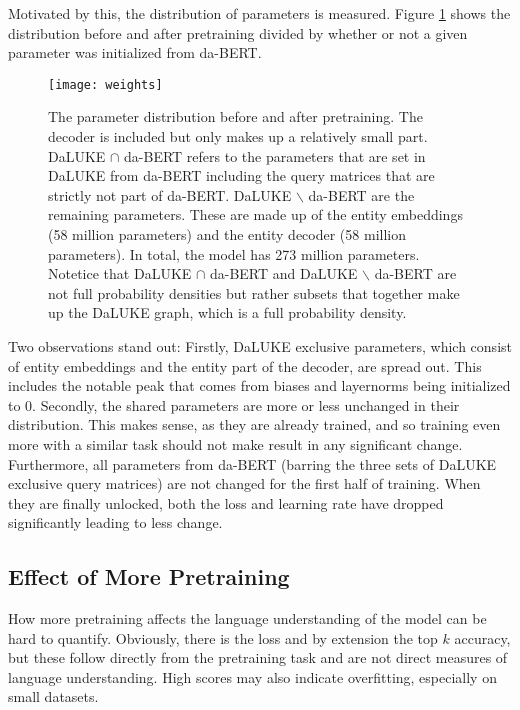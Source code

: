 \documentclass[main.tex]{subfiles}
\begin{document}
Motivated by this, the distribution of parameters is measured.
Figure \ref{fig:weight-dist} shows the distribution before and after pretraining divided by whether or not a given parameter was initialized from da-BERT.
\begin{figure}[H]
    \centering
    \texttt{[image: weights]}
    \caption{
        The parameter distribution before and after pretraining.
        The decoder is included but only makes up a relatively small part.
        DaLUKE $ \cap $ da-BERT refers to the parameters that are set in DaLUKE from da-BERT including the query matrices that are strictly not part of da-BERT.
        DaLUKE $ \backslash $ da-BERT are the remaining parameters.
        These are made up of the entity embeddings (58 million parameters) and the entity decoder (58 million parameters).
        In total, the model has 273 million parameters.
        Notetice that DaLUKE $ \cap $ da-BERT and DaLUKE $ \backslash $ da-BERT are not full probability densities but rather subsets that together make up the DaLUKE graph, which is a full probability density.   
    }
    \label{fig:weight-dist}
\end{figure}\noindent
Two observations stand out:
Firstly, DaLUKE exclusive parameters, which consist of entity embeddings and the entity part of the decoder, are spread out.
This includes the notable peak that comes from biases and layernorms being initialized to 0.
Secondly, the shared parameters are more or less unchanged in their distribution.
This makes sense, as they are already trained, and so training even more with a similar task should not make result in any significant change.
Furthermore, all parameters from da-BERT (barring the three sets of DaLUKE exclusive query matrices) are not changed for the first half of training.
When they are finally unlocked, both the loss and learning rate have dropped significantly leading to less change.

\subsection{Effect of More Pretraining}
How more pretraining affects the language understanding of the model can be hard to quantify.
Obviously, there is the loss and by extension the top $ k $ accuracy, but these follow directly from the pretraining task and are not direct measures of language understanding.
High scores may also indicate overfitting, especially on small datasets.
\end{document}
